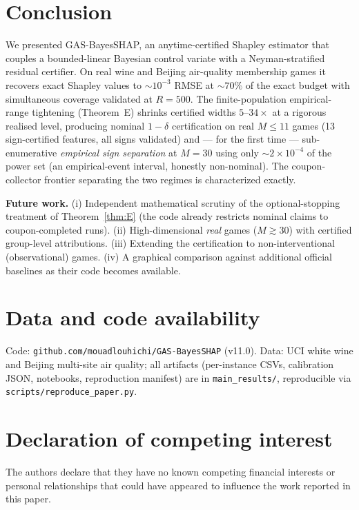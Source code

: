 \documentclass[preprint,12pt]{elsarticle}
\begin{document}
\section{Conclusion}\label{sec:concl}

We presented GAS-BayesSHAP, an anytime-certified Shapley estimator that couples a bounded-linear Bayesian control variate with a Neyman-stratified residual certifier. On real wine and Beijing air-quality membership games it recovers exact Shapley values to $\sim\!10^{-3}$ RMSE at $\sim\!70\%$ of the exact budget with simultaneous coverage validated at $R=500$. The finite-population empirical-range tightening (Theorem~E) shrinks certified widths $5$--$34\times$ at a rigorous realised level, producing nominal $1-\delta$ certification on real $M\le11$ games (13 sign-certified features, all signs validated) and --- for the first time --- sub-enumerative \emph{empirical sign separation} at $M=30$ using only $\sim\!2\times10^{-4}$ of the power set (an empirical-event interval, honestly non-nominal). The coupon-collector frontier separating the two regimes is characterized exactly.

\textbf{Future work.} (i) Independent mathematical scrutiny of the optional-stopping treatment of Theorem~\ref{thm:E} (the code already restricts nominal claims to coupon-completed runs). (ii) High-dimensional \emph{real} games ($M\gtrsim30$) with certified group-level attributions. (iii) Extending the certification to non-interventional (observational) games. (iv) A graphical comparison against additional official baselines as their code becomes available.

\section*{Data and code availability}
Code: \texttt{github.com/mouadlouhichi/GAS-BayesSHAP} (v11.0). Data: UCI white wine and Beijing multi-site air quality; all artifacts (per-instance CSVs, calibration JSON, notebooks, reproduction manifest) are in \texttt{main\_results/}, reproducible via \texttt{scripts/reproduce\_paper.py}.

\section*{Declaration of competing interest}
The authors declare that they have no known competing financial interests or personal relationships that could have appeared to influence the work reported in this paper.
\end{document}
